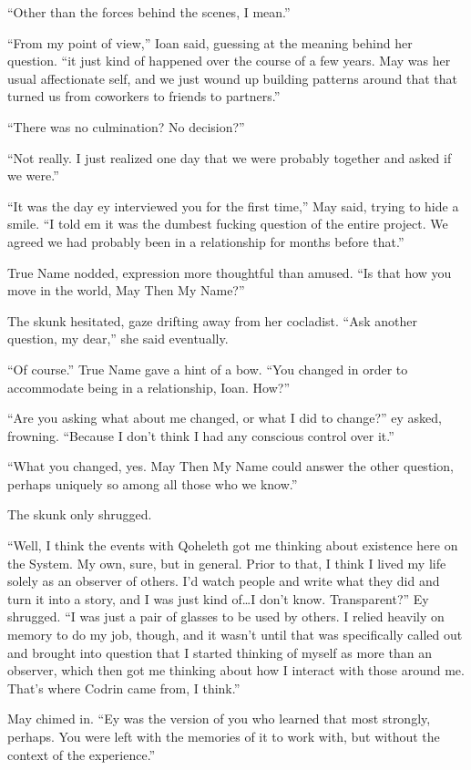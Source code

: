 ``Other than the forces behind the scenes, I mean.''

``From my point of view,'' Ioan said, guessing at the meaning behind her question. ``it just kind of happened over the course of a few years. May was her usual affectionate self, and we just wound up building patterns around that that turned us from coworkers to friends to partners.''

``There was no culmination? No decision?''

``Not really. I just realized one day that we were probably together and asked if we were.''

``It was the day ey interviewed you for the first time,'' May said, trying to hide a smile. ``I told em it was the dumbest fucking question of the entire project. We agreed we had probably been in a relationship for months before that.''

True Name nodded, expression more thoughtful than amused. ``Is that how you move in the world, May Then My Name?''

The skunk hesitated, gaze drifting away from her cocladist. ``Ask another question, my dear,'' she said eventually.

``Of course.'' True Name gave a hint of a bow. ``You changed in order to accommodate being in a relationship, Ioan. How?''

``Are you asking what about me changed, or what I did to change?'' ey asked, frowning. ``Because I don't think I had any conscious control over it.''

``What you changed, yes. May Then My Name could answer the other question, perhaps uniquely so among all those who we know.''

The skunk only shrugged.

``Well, I think the events with Qoheleth got me thinking about existence here on the System. My own, sure, but in general. Prior to that, I think I lived my life solely as an observer of others. I'd watch people and write what they did and turn it into a story, and I was just kind of\ldots I don't know. Transparent?'' Ey shrugged. ``I was just a pair of glasses to be used by others. I relied heavily on memory to do my job, though, and it wasn't until that was specifically called out and brought into question that I started thinking of myself as more than an observer, which then got me thinking about how I interact with those around me. That's where Codrin came from, I think.''

May chimed in. ``Ey was the version of you who learned that most strongly, perhaps. You were left with the memories of it to work with, but without the context of the experience.''

